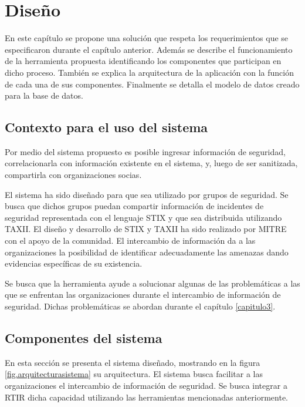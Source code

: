 \makeatother
\setlength\tabcolsep{1mm}
\renewcommand\arraystretch{1.3}
\renewcommand\theFigura{\arabic{FiguraCap4}}
\renewcommand\theTabla{\arabic{TablaCap4}}

\chapter{Diseño}
\label{capitulo4}
	En este capítulo se propone una solución que respeta los requerimientos que se especificaron
		durante el capítulo anterior. Además se describe el funcionamiento de la herramienta propuesta identificando los componentes que
		participan en dicho proceso. También se explica la arquitectura de la aplicación con la función de cada una de sus
		componentes. Finalmente se detalla el modelo de datos creado para la base de datos.
	
	\section{Contexto para el uso del sistema} 
	Por medio del sistema propuesto es posible ingresar información de seguridad, correlacionarla
		con información existente en el sistema, y, luego de ser sanitizada, compartirla con organizaciones socias.
	
	
	\bigskip
	
	El sistema ha sido diseñado para que sea utilizado por grupos de seguridad. Se busca que
		dichos grupos puedan compartir información de incidentes de seguridad representada con el lenguaje STIX y que sea
		distribuida utilizando TAXII. El diseño y desarrollo de STIX y TAXII ha sido realizado por MITRE con el apoyo de la
		comunidad. El intercambio de información da a las organizaciones la posibilidad de identificar adecuadamente las
		amenazas dando evidencias específicas de su existencia.
	
	
	\bigskip
	
	Se busca que la herramienta ayude a solucionar algunas de las problemáticas a las que se
		enfrentan las organizaciones durante el intercambio de información de seguridad. Dichas problemáticas se abordan
		durante el capítulo \ref{capitulo3}.
	
	\section{Componentes del sistema}
	
	\bigskip
	
	En esta sección se presenta el sistema diseñado, mostrando en la figura \ref{fig.arquitecturasistema} su arquitectura. El sistema busca facilitar a las organizaciones el intercambio de información de seguridad. Se busca integrar a RTIR dicha capacidad utilizando las herramientas
		mencionadas anteriormente.
	
